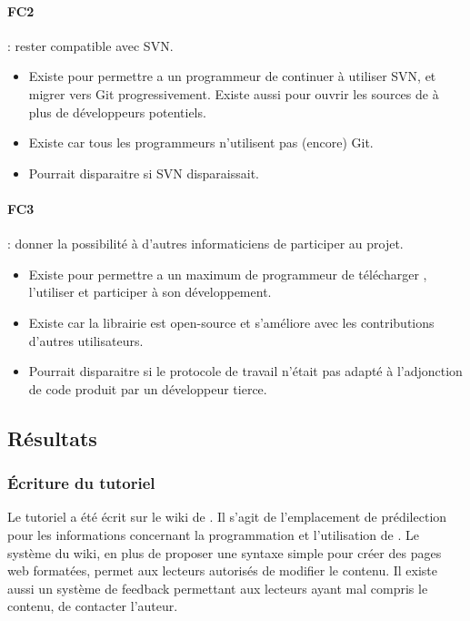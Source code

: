 \paragraph*{FC2} : rester compatible avec SVN.
\begin{itemize}
  \item Existe pour permettre a un programmeur de continuer à utiliser SVN, et migrer vers Git progressivement.
  Existe aussi pour ouvrir les sources de {\gofigure} à plus de développeurs potentiels.
  \item Existe car tous les programmeurs n'utilisent pas (encore) Git.
  \item Pourrait disparaitre si SVN disparaissait.
\end{itemize}

\paragraph*{FC3} : donner la possibilité à d'autres informaticiens de participer au projet.
\begin{itemize}
  \item Existe pour permettre a un maximum de programmeur de télécharger {\gofigure}, l'utiliser et participer à son développement.
  \item Existe car la librairie est open-source et s'améliore avec les contributions d'autres utilisateurs.
  \item Pourrait disparaitre si le protocole de travail n'était pas adapté à l'adjonction de code produit par un développeur tierce.
\end{itemize}


\subsection{Résultats}

\subsubsection{Écriture du tutoriel}

Le tutoriel a été écrit sur le wiki de {\gofigure}. Il s'agit de l'emplacement de prédilection pour les informations 
concernant la programmation et l'utilisation de {\gofigure}. Le système du wiki, en plus de proposer une syntaxe simple 
pour créer des pages web formatées, permet aux lecteurs autorisés de modifier le contenu. 
Il existe aussi un système de feedback permettant aux lecteurs ayant mal compris le contenu, de contacter l'auteur.

